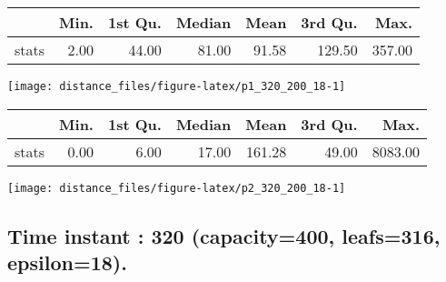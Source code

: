 \documentclass[
  9pt,
  landscape]{article}
\begin{document}
\begin{minipage}{0.5\textwidth} 
\centering 
\begin{tabular}{rrrrrrr}
  \hline
 & Min. & 1st Qu. & Median & Mean & 3rd Qu. & Max. \\ 
  \hline
stats & 2.00 & 44.00 & 81.00 & 91.58 & 129.50 & 357.00 \\ 
   \hline
\end{tabular}
\vspace{0.5cm} 


\texttt{[image: distance\_files/figure-latex/p1\_320\_200\_18-1]} 

\end{minipage} 
\begin{minipage}{0.5\textwidth} 
\centering 
\begin{tabular}{rrrrrrr}
  \hline
 & Min. & 1st Qu. & Median & Mean & 3rd Qu. & Max. \\ 
  \hline
stats & 0.00 & 6.00 & 17.00 & 161.28 & 49.00 & 8083.00 \\ 
   \hline
\end{tabular}
\vspace{0.5cm} 


\texttt{[image: distance\_files/figure-latex/p2\_320\_200\_18-1]} 

\end{minipage}

\pagebreak

\hypertarget{time-instant-320-capacity400-leafs316-epsilon18.}{%
\subsection{Time instant : 320 (capacity=400, leafs=316,
epsilon=18).}\label{time-instant-320-capacity400-leafs316-epsilon18.}}
\end{document}

